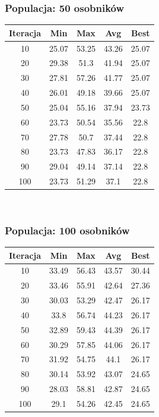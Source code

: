 \documentclass[a4paper,11pt]{article}
\begin{document}
			\subsubsection{Populacja: 50 osobników}
				\begin{tabular}{|c|c|c|c|c|}
					\hline 
					Iteracja &  Min &  Max & Avg & Best\\
					\hline
					10 & 25.07 & 53.25 & 43.26 & 25.07\\
					\hline
					20 & 29.38 & 51.3 & 41.94 & 25.07\\
					\hline
					30 & 27.81 & 57.26 & 41.77 & 25.07\\
					\hline
					40 & 26.01 & 49.18 & 39.66 & 25.07\\
					\hline
					50 & 25.04 & 55.16 & 37.94 & 23.73\\
					\hline
					60 & 23.73 & 50.54 & 35.56 & 22.8\\
					\hline
					70 & 27.78 & 50.7 & 37.44 & 22.8\\
					\hline
					80 & 23.73 & 47.83 & 36.17 & 22.8\\
					\hline
					90 & 29.04 & 49.14 & 37.14 & 22.8\\
					\hline
					100 & 23.73 & 51.29 & 37.1 & 22.8\\
					\hline
				\end{tabular} \\
			\subsubsection{Populacja: 100 osobników}
				\begin{tabular}{|c|c|c|c|c|}
					\hline 
					Iteracja &  Min &  Max & Avg & Best\\
					\hline
					10 & 33.49 & 56.43 & 43.57 & 30.44\\
					\hline
					20 & 33.46 & 55.91 & 42.64 & 27.36\\
					\hline
					30 & 30.03 & 53.29 & 42.47 & 26.17\\
					\hline
					40 & 33.8 & 56.74 & 44.23 & 26.17\\
					\hline
					50 & 32.89 & 59.43 & 44.39 & 26.17\\
					\hline
					60 & 30.29 & 57.85 & 44.06 & 26.17\\
					\hline
					70 & 31.92 & 54.75 & 44.1 & 26.17\\
					\hline
					80 & 30.14 & 53.92 & 43.07 & 24.65\\
					\hline
					90 & 28.03 & 58.81 & 42.87 & 24.65\\
					\hline
					100 & 29.1 & 54.26 & 42.45 & 24.65\\
					\hline
				\end{tabular} \\
				\newpage
\end{document}
